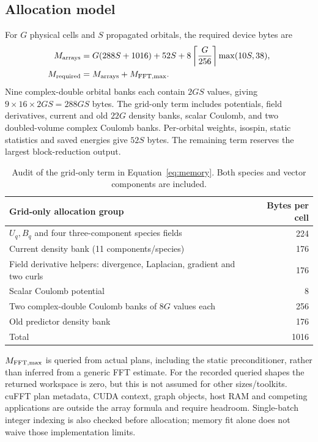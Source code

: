 \documentclass[11pt,a4paper]{article}
\begin{document}
\subsection{Allocation model}
For $G$ physical cells and $S$ propagated orbitals, the required device bytes
are
\begin{align}
 M_{\rm arrays}&=G(288S+1016)+52S
     +8\left\lceil\frac{G}{256}\right\rceil\max(10S,38),\\
 M_{\rm required}&=M_{\rm arrays}+M_{\rm FFT,max}.
 \label{eq:memory}
\end{align}
Nine complex-double orbital banks each contain $2GS$ values, giving
$9\times16\times2GS=288GS$ bytes. The grid-only term includes potentials,
field derivatives, current and old $22G$ density banks, scalar Coulomb,
and two doubled-volume complex Coulomb banks. Per-orbital weights,
isospin, static statistics and saved energies give $52S$ bytes. The
remaining term reserves the largest block-reduction output.

\begin{table}[htbp]\centering\small
\begin{tabular}{@{}p{.64\linewidth}r@{}}\toprule
Grid-only allocation group & Bytes per cell\\\midrule
$U_q,B_q$ and four three-component species fields & 224\\
Current density bank (11 components/species) & 176\\
Field derivative helpers: divergence, Laplacian, gradient and two curls & 176\\
Scalar Coulomb potential & 8\\
Two complex-double Coulomb banks of $8G$ values each & 256\\
Old predictor density bank & 176\\\midrule
Total & 1016\\\bottomrule
\end{tabular}
\caption{Audit of the grid-only term in Equation~\eqref{eq:memory}. Both species and vector components are included.}
\label{tab:memory-components}\end{table}

$M_{\rm FFT,max}$ is queried from actual plans, including the static
preconditioner, rather than inferred from a generic FFT estimate. For the
recorded queried shapes the returned workspace is zero, but this is not
assumed for other sizes/toolkits. cuFFT plan metadata, CUDA context, graph
objects, host RAM and competing applications are outside the array formula
and require headroom. Single-batch integer indexing is also checked before
allocation; memory fit alone does not waive those implementation limits.
\end{document}
